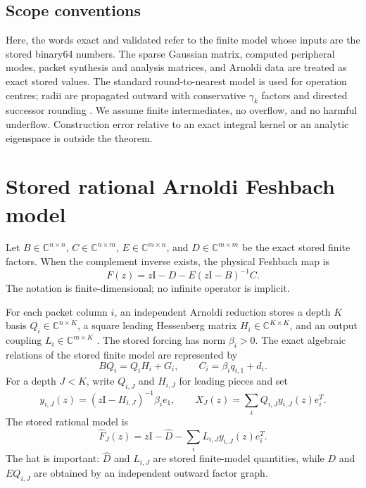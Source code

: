 \documentclass[11pt]{article}
\theoremstyle{definition}
\theoremstyle{remark}
\newcommand{\C}{\mathbb C}
\newcommand{\Id}{\mathrm I}
\begin{document}
\subsection{Scope conventions}

Here, the words exact and validated refer to the finite model whose inputs
are the stored binary64 numbers.  The sparse Gaussian matrix, computed
peripheral modes, packet synthesis and analysis matrices, and Arnoldi data
are treated as exact stored values.  The standard round-to-nearest model is
used for operation centres; radii are propagated outward with conservative
$\gamma_k$ factors and directed successor rounding
\citep{Higham2002,Rump2010,MooreKearfottCloud2009}.  We assume finite
intermediates, no overflow, and no harmful underflow.  Construction error
relative to an exact integral kernel or an analytic eigenspace is outside
the theorem.


\section{Stored rational Arnoldi Feshbach model}
\label{sec:model}

Let $B\in\C^{n\times n}$, $C\in\C^{n\times m}$,
$E\in\C^{m\times n}$, and $D\in\C^{m\times m}$ be the exact stored
finite factors.  When the complement inverse exists, the physical Feshbach
map is
\begin{equation}
 F(z)=z\Id-D-E(z\Id-B)^{-1}C.
 \label{eq:physical-feshbach}
\end{equation}
The notation is finite-dimensional; no infinite operator is implicit.

For each packet column $i$, an independent Arnoldi reduction stores a depth
$K$ basis $Q_i\in\C^{n\times K}$, a square leading Hessenberg matrix
$H_i\in\C^{K\times K}$, and an output coupling
$L_i\in\C^{m\times K}$ \citep{Saad1980}.  The stored forcing has norm
$\beta_i>0$.  The
exact algebraic relations of the stored finite model are represented by
\begin{equation}
 BQ_i=Q_iH_i+G_i,\qquad
 C_i=\beta_i q_{i,1}+d_i.
 \label{eq:stored-relations}
\end{equation}
For a depth $J<K$, write $Q_{i,J}$ and $H_{i,J}$ for leading pieces and set
\begin{equation}
 y_{i,J}(z)=(z\Id-H_{i,J})^{-1}\beta_i e_1,\qquad
 X_J(z)=\sum_i Q_{i,J}y_{i,J}(z)e_i^T.
 \label{eq:coordinates}
\end{equation}
The stored rational model is
\begin{equation}
 \widehat F_J(z)=z\Id-\widehat D
             -\sum_i L_{i,J}y_{i,J}(z)e_i^T.
 \label{eq:model-feshbach}
\end{equation}
The hat is important: $\widehat D$ and $L_{i,J}$ are stored finite-model
quantities, while $D$ and $EQ_{i,J}$ are obtained by an independent
outward factor graph.
\end{document}

